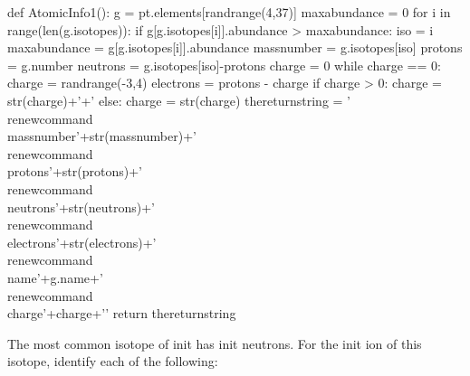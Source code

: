 

\begin{pycode}

def AtomicInfo1():
	g = pt.elements[randrange(4,37)]
	maxabundance = 0
	for i in range(len(g.isotopes)):
		if g[g.isotopes[i]].abundance > maxabundance:
			iso = i
			maxabundance = g[g.isotopes[i]].abundance
	massnumber = g.isotopes[iso]
	protons = g.number
	neutrons = g.isotopes[iso]-protons
	charge = 0
	while charge == 0:
		charge = randrange(-3,4)
	electrons = protons - charge
	if charge > 0:
		charge = str(charge)+'+'
	else: 
		charge = str(charge)
	thereturnstring = '\\renewcommand{\\massnumber}{'+str(massnumber)+'} \
	\\renewcommand{\\protons}{'+str(protons)+'} \
	\\renewcommand{\\neutrons}{'+str(neutrons)+'} \
	\\renewcommand{\\electrons}{'+str(electrons)+'} \
	\\renewcommand{\\name}{'+g.name+'} \
	\\renewcommand{\\charge}{'+charge+'}'
	return thereturnstring

\end{pycode}

\providecommand{\massnumber}{init}
\providecommand{\protons}{init}
\providecommand{\neutrons}{init}
\providecommand{\electrons}{init} 
\providecommand{\charge}{init}
\providecommand{\name}{init}

\py{AtomicInfo1()}

The most common isotope of \name{} has \neutrons{} neutrons. For the \charge{} ion of this isotope, identify each of the following: 


